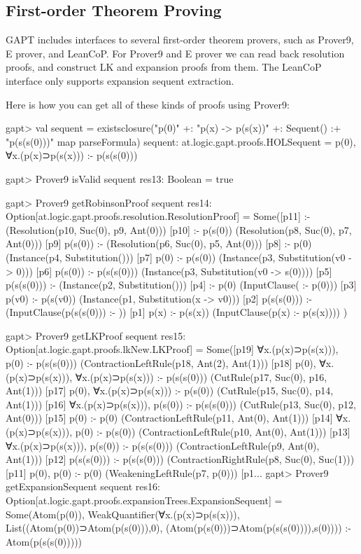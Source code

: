 \documentclass[a4paper,11pt]{article}
\begin{document}
\subsection{First-order Theorem Proving}

GAPT includes interfaces to several first-order theorem provers, such as
Prover9, E prover, and LeanCoP.  For Prover9 and E prover we can read back
resolution proofs, and construct LK and expansion proofs from them.  The
LeanCoP interface only supports expansion sequent extraction.

Here is how you can get all of these kinds of proofs using Prover9:
\begin{clilisting}
gapt> val sequent = existsclosure("p(0)" +: "p(x) -> p(s(x))" +: Sequent() :+ "p(s(s(0)))" map parseFormula)
sequent: at.logic.gapt.proofs.HOLSequent = p(0), ∀x.(p(x)⊃p(s(x))) :- p(s(s(0)))

\end{clilisting}

\begin{clilisting}
gapt> Prover9 isValid sequent
res13: Boolean = true

gapt> Prover9 getRobinsonProof sequent
res14: Option[at.logic.gapt.proofs.resolution.ResolutionProof] =
Some([p11]  :-     (Resolution(p10, Suc(0), p9, Ant(0)))
[p10]  :- p(s(0))    (Resolution(p8, Suc(0), p7, Ant(0)))
[p9] p(s(0)) :-     (Resolution(p6, Suc(0), p5, Ant(0)))
[p8]  :- p(0)    (Instance(p4, Substitution()))
[p7] p(0) :- p(s(0))    (Instance(p3, Substitution(v0 -> 0)))
[p6] p(s(0)) :- p(s(s(0)))    (Instance(p3, Substitution(v0 -> s(0))))
[p5] p(s(s(0))) :-     (Instance(p2, Substitution()))
[p4]  :- p(0)    (InputClause( :- p(0)))
[p3] p(v0) :- p(s(v0))    (Instance(p1, Substitution(x -> v0)))
[p2] p(s(s(0))) :-     (InputClause(p(s(s(0))) :- ))
[p1] p(x) :- p(s(x))    (InputClause(p(x) :- p(s(x))))
)

gapt> Prover9 getLKProof sequent
res15: Option[at.logic.gapt.proofs.lkNew.LKProof] =
Some([p19] ∀x.(p(x)⊃p(s(x))), p(0) :- p(s(s(0)))    (ContractionLeftRule(p18, Ant(2), Ant(1)))
[p18] p(0), ∀x.(p(x)⊃p(s(x))), ∀x.(p(x)⊃p(s(x))) :- p(s(s(0)))    (CutRule(p17, Suc(0), p16, Ant(1)))
[p17] p(0), ∀x.(p(x)⊃p(s(x))) :- p(s(0))    (CutRule(p15, Suc(0), p14, Ant(1)))
[p16] ∀x.(p(x)⊃p(s(x))), p(s(0)) :- p(s(s(0)))    (CutRule(p13, Suc(0), p12, Ant(0)))
[p15] p(0) :- p(0)    (ContractionLeftRule(p11, Ant(0), Ant(1)))
[p14] ∀x.(p(x)⊃p(s(x))), p(0) :- p(s(0))    (ContractionLeftRule(p10, Ant(0), Ant(1)))
[p13] ∀x.(p(x)⊃p(s(x))), p(s(0)) :- p(s(s(0)))    (ContractionLeftRule(p9, Ant(0), Ant(1)))
[p12] p(s(s(0))) :- p(s(s(0)))    (ContractionRightRule(p8, Suc(0), Suc(1)))
[p11] p(0), p(0) :- p(0)    (WeakeningLeftRule(p7, p(0)))
[p1...
gapt> Prover9 getExpansionSequent sequent
res16: Option[at.logic.gapt.proofs.expansionTrees.ExpansionSequent] = Some(Atom(p(0)), WeakQuantifier(∀x.(p(x)⊃p(s(x))), List((Atom(p(0))⊃Atom(p(s(0))),0), (Atom(p(s(0)))⊃Atom(p(s(s(0)))),s(0)))) :- Atom(p(s(s(0)))))

\end{clilisting}
\end{document}
